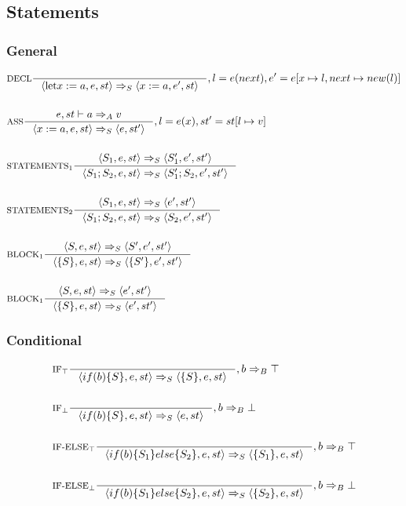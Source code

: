 \subsection{Statements}
\newcommand{\Tlet}{\text{let}}
\subsubsection{General}
\begin{align*}
&\inference[$\text{DECL}$]{}
                         {\Braket{\Tlet x := a,e,st} \Rightarrow_S \Braket{x := a, e',st}}
												{, l = e(next), e' = e[x\mapsto l, next\mapsto new(l)]}
\\\\
&\inference[$\text{ASS}$]{e,st \vdash a \Rightarrow_A v}
                         {\Braket{x := a,e,st} \Rightarrow_S \Braket{e,st'}}
												{, l = e(x), st' = st[l\mapsto v]}
\\\\
&\inference[$\text{STATEMENTS}_1$]{\Braket{S_1,e,st} \Rightarrow_S \Braket{S_1',e',st'}}
                         {\Braket{S_1;S_2,e,st} \Rightarrow_S \Braket{S_1';S_2,e',st'}}
\\\\
&\inference[$\text{STATEMENTS}_2$]{\Braket{S_1,e,st} \Rightarrow_S \Braket{e',st'}}
                         {\Braket{S_1;S_2,e,st} \Rightarrow_S \Braket{S_2,e',st'}}
\\\\
&\inference[$\text{BLOCK}_1$]{\Braket{S,e,st} \Rightarrow_S \Braket{S',e',st'}}
                         {\Braket{\{S\},e,st} \Rightarrow_S \Braket{\{S'\},e',st'}}
\\\\
&\inference[$\text{BLOCK}_1$]{\Braket{S,e,st} \Rightarrow_S \Braket{e',st'}}
                         {\Braket{\{S\},e,st} \Rightarrow_S \Braket{e',st'}}
\end{align*}

\subsubsection{Conditional}
\newcommand{\Tif}{\text{if}}
\newcommand{\Telse}{\text{else}}

\begin{align*}
&\inference[$\text{IF}_\top$]{}
                      {\Braket{if(b)\{S\},e,st} \Rightarrow_S \Braket{\{S\},e,st}}
											{,b \Rightarrow_B \top}
\\\\
&\inference[$\text{IF}_\bot$]{}
                      {\Braket{if(b)\{S\},e,st} \Rightarrow_S \Braket{e,st}}
											{,b \Rightarrow_B \bot}
\\\\
&\inference[$\text{IF-ELSE}_\top$]{}
                      {\Braket{if(b)\{S_1\}else\{S_2\},e,st} \Rightarrow_S \Braket{\{S_1\},e,st}}
											{,b \Rightarrow_B \top}
\\\\
&\inference[$\text{IF-ELSE}_\bot$]{}
                      {\Braket{if(b)\{S_1\}else\{S_2\},e,st} \Rightarrow_S \Braket{\{S_2\},e,st}}
											{,b \Rightarrow_B \bot}
\end{align*}
